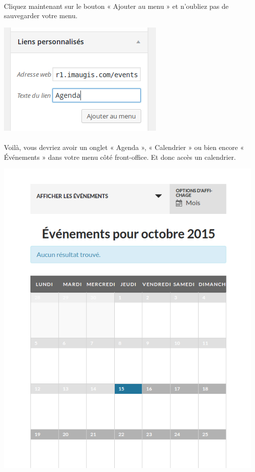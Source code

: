 \documentclass[10pt,a4paper]{article}
\begin{document}
\paragraph{}Cliquez maintenant sur le bouton « Ajouter au menu » et n'oubliez pas de sauvegarder votre menu.
\begin{center}
\includegraphics[scale=0.3]{img/0194.png}
\end{center}
\paragraph{}Voilà, vous devriez avoir un onglet « Agenda », « Calendrier » ou bien encore « Événements » dans votre menu côté front-office. Et donc accès un calendrier.
\begin{center}
\includegraphics[scale=0.3]{img/0195.png}
\end{center}
\end{document}
